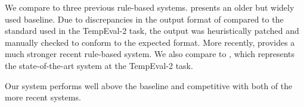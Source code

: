 We compare to three previous rule-based systems.
 \cite{key:2000mani-temporal} presents an older but widely
	used baseline.
Due to discrepancies in the output format of  compared to the 
	standard used in the TempEval-2 task, the output was heuristically patched
	and manually checked to conform to the expected format.
More recently, \needcite provides a much stronger recent rule-based
	system.
We also compare to  \cite{key:2010strotgen-temporal}, 
	which represents the state-of-the-art system at the TempEval-2 task.

Our system performs well above the  baseline and competitive
	with both of the more recent systems.



